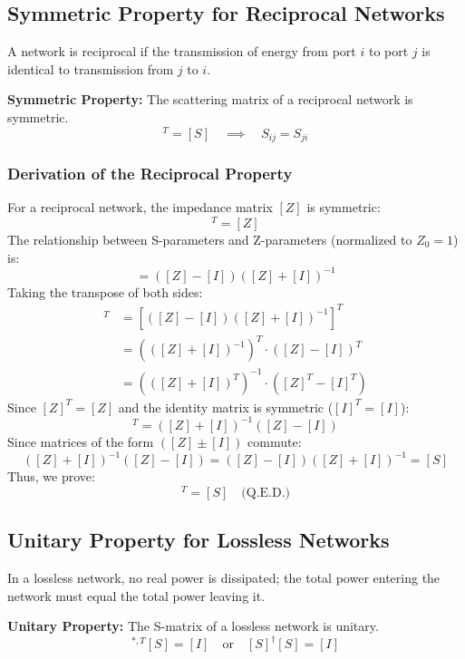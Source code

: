 \documentclass[12pt,a4paper]{article}
\begin{document}
\subsection{Symmetric Property for Reciprocal Networks}
A network is reciprocal if the transmission of energy from port $i$ to port $j$ is identical to transmission from $j$ to $i$.
\begin{tcolorbox}[defbox]
\textbf{Symmetric Property:} The scattering matrix of a reciprocal network is symmetric.
\begin{equation}
  [S]^T = [S] \quad \implies \quad S_{ij} = S_{ji}
\end{equation}
\end{tcolorbox}

\subsubsection{Derivation of the Reciprocal Property}
For a reciprocal network, the impedance matrix $[Z]$ is symmetric:
\begin{equation*}
  [Z]^T = [Z]
\end{equation*}
The relationship between S-parameters and Z-parameters (normalized to $Z_0 = 1$) is:
\begin{equation}
  [S] = ([Z] - [I])([Z] + [I])^{-1}
\end{equation}
Taking the transpose of both sides:
\begin{align*}
  [S]^T &= \left[ ([Z] - [I])([Z] + [I])^{-1} \right]^T \\
  &= \left( ([Z] + [I])^{-1} \right)^T \cdot ([Z] - [I])^T \\
  &= \left( ([Z] + [I])^T \right)^{-1} \cdot ([Z]^T - [I]^T)
\end{align*}
Since $[Z]^T = [Z]$ and the identity matrix is symmetric ($[I]^T = [I]$):
\begin{equation*}
  [S]^T = ([Z] + [I])^{-1} ([Z] - [I])
\end{equation*}
Since matrices of the form $([Z] \pm [I])$ commute:
\begin{equation*}
  ([Z] + [I])^{-1} ([Z] - [I]) = ([Z] - [I]) ([Z] + [I])^{-1} = [S]
\end{equation*}
Thus, we prove:
\begin{equation}
  [S]^T = [S] \quad \text{(Q.E.D.)}
\end{equation}

\subsection{Unitary Property for Lossless Networks}
In a lossless network, no real power is dissipated; the total power entering the network must equal the total power leaving it.
\begin{tcolorbox}[defbox]
\textbf{Unitary Property:} The S-matrix of a lossless network is unitary.
\begin{equation}
  [S]^{*, T} [S] = [I] \quad \text{or} \quad [S]^\dagger [S] = [I]
\end{equation}
\end{tcolorbox}
\end{document}
